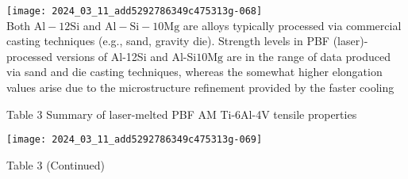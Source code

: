\documentclass[10pt]{article}
\begin{document}
\texttt{[image: 2024\_03\_11\_add5292786349c475313g-068]}\\
Both $\mathrm{Al}-12 \mathrm{Si}$ and $\mathrm{Al}-\mathrm{Si}-10 \mathrm{Mg}$ are alloys typically processed via commercial casting techniques (e.g., sand, gravity die). Strength levels in PBF (laser)-processed versions of Al-12Si and Al-Si$10 \mathrm{Mg}$ are in the range of data produced via sand and die casting techniques, whereas the somewhat higher elongation values arise due to the microstructure refinement provided by the faster cooling

Table 3 Summary of laser-melted PBF AM Ti-6Al-4V tensile properties

\begin{center}
\texttt{[image: 2024\_03\_11\_add5292786349c475313g-069]}
\end{center}

Table 3 (Continued)
\end{document}
